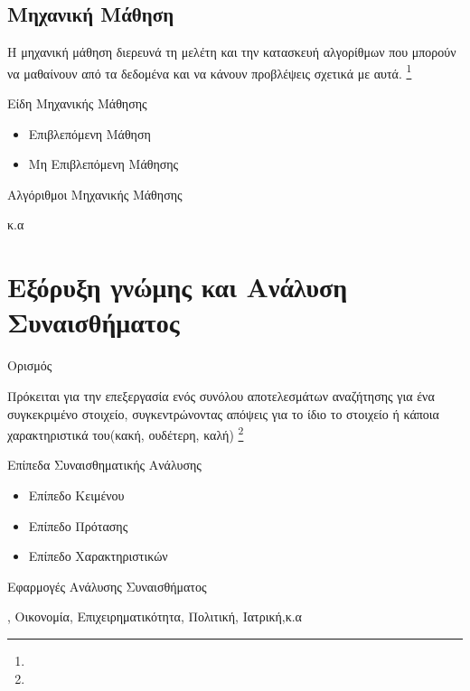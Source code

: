 \documentclass{beamer}
\begin{document}
\subsection{Μηχανική Μάθηση}

\begin{frame}
\item Η μηχανική μάθηση διερευνά τη μελέτη και την κατασκευή αλγορίθμων που μπορούν να μαθαίνουν από τα δεδομένα και να κάνουν προβλέψεις σχετικά με αυτά. \footnote{{}}
\vfill
\begin{flushleft}
{\color{blue}Είδη Μηχανικής Μάθησης}
\end{flushleft}
\vfill
\begin{itemize}
\item Επιβλεπόμενη Μάθηση {}
\item Μη Επιβλεπόμενη Μάθησης {}
\end{itemize}
\begin{flushleft}
{\color{blue}Αλγόριθμοι Μηχανικής Μάθησης}
\end{flushleft}
\vfill
\item {} κ.α
\vfill


\end{frame}


\section{Εξόρυξη γνώμης και Ανάλυση Συναισθήματος}

\begin{frame}
\begin{flushleft}
{\color{blue}Ορισμός}
\end{flushleft}
Πρόκειται για την επεξεργασία ενός συνόλου αποτελεσμάτων αναζήτησης για ένα συγκεκριμένο στοιχείο, συγκεντρώνοντας απόψεις για το ίδιο το στοιχείο ή κάποια χαρακτηριστικά του(κακή, ουδέτερη, καλή) \footnote{{}}
\begin{flushleft}
{\color{blue}Επίπεδα Συναισθηματικής Ανάλυσης}
\end{flushleft}
\begin{itemize}
\item Επίπεδο Κειμένου
\item Επίπεδο Πρότασης
\item Επίπεδο Χαρακτηριστικών
\end{itemize}
\begin{flushleft}
{\color{blue}Εφαρμογές Ανάλυσης Συναισθήματος}
\end{flushleft}
{}, Οικονομία, Επιχειρηματικότητα, Πολιτική, Ιατρική,κ.α

\end{frame}
\end{document}
